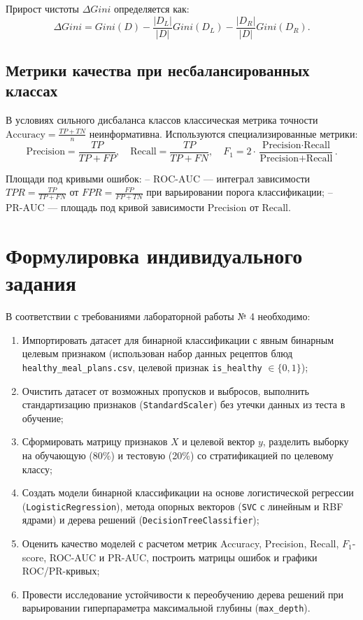 \documentclass[14pt,a4paper]{extarticle}
\begin{document}
Прирост чистоты $\Delta Gini$ определяется как:
\begin{equation}
    \Delta Gini = Gini(D) - \frac{|D_L|}{|D|} Gini(D_L) - \frac{|D_R|}{|D|} Gini(D_R).
\end{equation}

\subsection{Метрики качества при несбалансированных классах}

В условиях сильного дисбаланса классов классическая метрика точности $\text{Accuracy} = \frac{TP + TN}{n}$ неинформативна. Используются специализированные метрики:
\begin{equation}
    \text{Precision} = \frac{TP}{TP + FP}, \quad \text{Recall} = \frac{TP}{TP + FN}, \quad F_1 = 2 \cdot \frac{\text{Precision} \cdot \text{Recall}}{\text{Precision} + \text{Recall}}.
\end{equation}

Площади под кривыми ошибок:
-- $\text{ROC-AUC}$ --- интеграл зависимости $TPR = \frac{TP}{TP + FN}$ от $FPR = \frac{FP}{FP + TN}$ при варьировании порога классификации;
-- $\text{PR-AUC}$ --- площадь под кривой зависимости $\text{Precision}$ от $\text{Recall}$.

\section{Формулировка индивидуального задания}

В соответствии с требованиями лабораторной работы № 4 необходимо:
\begin{enumerate}
    \item Импортировать датасет для бинарной классификации с явным бинарным целевым признаком (использован набор данных рецептов блюд \texttt{healthy\_meal\_plans.csv}, целевой признак \texttt{is\_healthy} $\in \{0, 1\}$);
    \item Очистить датасет от возможных пропусков и выбросов, выполнить стандартизацию признаков (\texttt{StandardScaler}) без утечки данных из теста в обучение;
    \item Сформировать матрицу признаков $X$ и целевой вектор $y$, разделить выборку на обучающую (80\%) и тестовую (20\%) со стратификацией по целевому классу;
    \item Создать модели бинарной классификации на основе логистической регрессии (\texttt{LogisticRegression}), метода опорных векторов (\texttt{SVC} с линейным и RBF ядрами) и дерева решений (\texttt{DecisionTreeClassifier});
    \item Оценить качество моделей с расчетом метрик Accuracy, Precision, Recall, $F_1$-score, ROC-AUC и PR-AUC, построить матрицы ошибок и графики ROC/PR-кривых;
    \item Провести исследование устойчивости к переобучению дерева решений при варьировании гиперпараметра максимальной глубины (\texttt{max\_depth}).
\end{enumerate}
\end{document}
